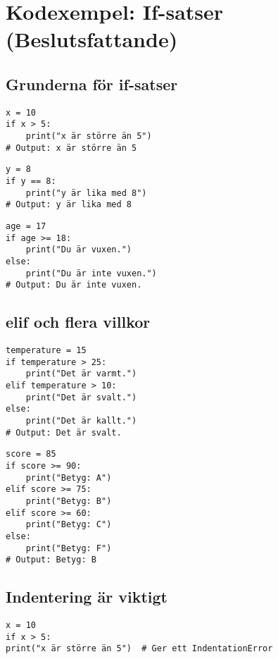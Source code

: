 \section{Kodexempel: If-satser (Beslutsfattande)}
\label{examples:if}
\subsection*{Grunderna för if-satser}

\begin{lstlisting}[title=Exempel 1: En enkel if-sats]
x = 10
if x > 5:
    print("x är större än 5")
# Output: x är större än 5
\end{lstlisting}

\begin{lstlisting}[title=Exempel 2: Kontrollera likhet]
y = 8
if y == 8:
    print("y är lika med 8")
# Output: y är lika med 8
\end{lstlisting}

\begin{lstlisting}[title=Exempel 3: Använda else]
age = 17
if age >= 18:
    print("Du är vuxen.")
else:
    print("Du är inte vuxen.")
# Output: Du är inte vuxen.
\end{lstlisting}

\subsection*{elif och flera villkor}

\begin{lstlisting}[title=Exempel 4: Använda elif för fler alternativ]
temperature = 15
if temperature > 25:
    print("Det är varmt.")
elif temperature > 10:
    print("Det är svalt.")
else:
    print("Det är kallt.")
# Output: Det är svalt.
\end{lstlisting}

\begin{lstlisting}[title=Exempel 5: If-elif-else med gränsvärden]
score = 85
if score >= 90:
    print("Betyg: A")
elif score >= 75:
    print("Betyg: B")
elif score >= 60:
    print("Betyg: C")
else:
    print("Betyg: F")
# Output: Betyg: B
\end{lstlisting}

\subsection*{Indentering är viktigt}

\begin{lstlisting}[title=Exempel 6: Felaktig indentering]
x = 10
if x > 5:
print("x är större än 5")  # Ger ett IndentationError
\end{lstlisting}

